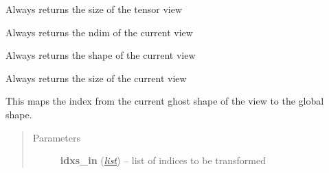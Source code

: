 \documentclass[a4paper,10pt,english]{sphinxmanual}
\begin{document}
\begin{fulllineitems}
\begin{fulllineitems}
\label{api-tw:TensorToolbox.core.TensorWrapper.get_size}
Always returns the size of the tensor view

\end{fulllineitems}


\begin{fulllineitems}
\label{api-tw:TensorToolbox.core.TensorWrapper.get_view_ndim}
Always returns the ndim of the current view

\end{fulllineitems}


\begin{fulllineitems}
\label{api-tw:TensorToolbox.core.TensorWrapper.get_view_shape}
Always returns the shape of the current view

\end{fulllineitems}


\begin{fulllineitems}
\label{api-tw:TensorToolbox.core.TensorWrapper.get_view_size}
Always returns the size of the current view

\end{fulllineitems}


\begin{fulllineitems}
\label{api-tw:TensorToolbox.core.TensorWrapper.ghost_to_global}
This maps the index from the current ghost shape of the view to the global shape.
\begin{quote}\begin{description}
\item[{Parameters}] \leavevmode
\textbf{idxs\_in} (\href{http://docs.python.org/library/functions.html\#list}{\emph{list}}) -- list of indices to be transformed

\end{description}\end{quote}


\end{fulllineitems}
\end{fulllineitems}
\end{document}

